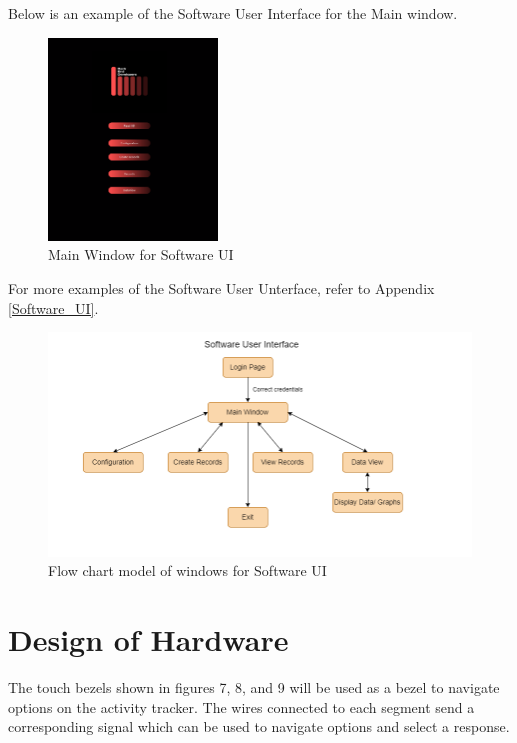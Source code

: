 \documentclass[12pt, titlepage]{article}
\begin{document}
Below is an example of the Software User Interface for the Main window.
\begin{figure}[H]
	\begin{center}
		 \includegraphics[width=0.4\textwidth]{MainWindow}
		\caption{Main Window for Software UI}
		\label{MainWindow} 
	\end{center}
\end{figure}

For more examples of the Software User Unterface, refer to Appendix \ref{Software_UI}.

\begin{figure}[H]
	\begin{center}
		 \includegraphics[width=1\textwidth]{SoftwareUI_FSM}
		\caption{Flow chart model of windows for Software UI}
		\label{SoftwareUI_FSM} 
	\end{center}
\end{figure}

\section{Design of Hardware}

The touch bezels shown in figures 7, 8, and 9 will be used as a bezel to navigate options on the activity tracker. The wires connected to each segment send a corresponding signal which can be used to navigate options and select a response.
\end{document}
